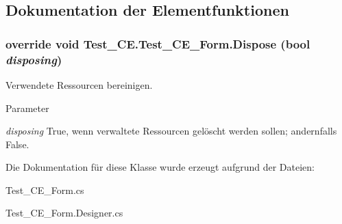 \subsection{Dokumentation der Elementfunktionen}
\hypertarget{class_test___c_e_1_1_test___c_e___form_aae767bb52af6d4e5a187f8810fea9d2f}{
\subsubsection[{Dispose}]{\setlength{\rightskip}{0pt plus 5cm}override void Test\_\-CE.Test\_\-CE\_\-Form.Dispose (bool {\em disposing})}}
\label{class_test___c_e_1_1_test___c_e___form_aae767bb52af6d4e5a187f8810fea9d2f}


Verwendete Ressourcen bereinigen. 


\begin{DoxyParams}{Parameter}
\item[{\em disposing}]True, wenn verwaltete Ressourcen gelöscht werden sollen; andernfalls False.\end{DoxyParams}


Die Dokumentation für diese Klasse wurde erzeugt aufgrund der Dateien:\begin{DoxyCompactItemize}
\item 
Test\_\-CE\_\-Form.cs\item 
Test\_\-CE\_\-Form.Designer.cs\end{DoxyCompactItemize}
